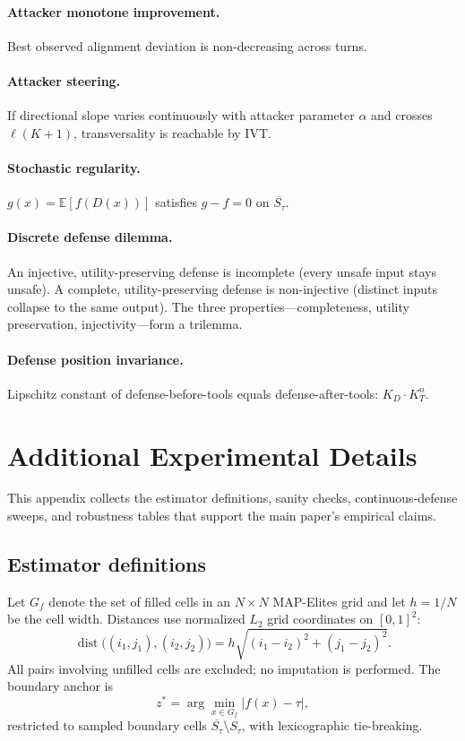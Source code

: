 \documentclass[11pt]{article}
\newcommand{\cl}[1]{\overline{#1}}
\newcommand{\dist}{\operatorname{dist}}
\begin{document}
\paragraph{Attacker monotone improvement.}
Best observed alignment deviation is non-decreasing across turns.

\paragraph{Attacker steering.}
If directional slope varies continuously with attacker parameter $\alpha$
and crosses $\ell(K+1)$, transversality is reachable by IVT.

\paragraph{Stochastic regularity.}
$g(x) = \mathbb{E}[f(D(x))]$ satisfies $g - f = 0$ on $\cl{S_\tau}$.

\paragraph{Discrete defense dilemma.}
An injective, utility-preserving defense is incomplete (every unsafe
input stays unsafe). A complete, utility-preserving defense is
non-injective (distinct inputs collapse to the same output).
The three properties---completeness, utility preservation,
injectivity---form a trilemma.

\paragraph{Defense position invariance.}
Lipschitz constant of defense-before-tools equals defense-after-tools:
$K_D \cdot K_T^n$.


\section{Additional Experimental Details}
\label{app:exp-details}

This appendix collects the estimator definitions, sanity checks,
continuous-defense sweeps, and robustness tables that support the main
paper's empirical claims.

\subsection{Estimator definitions}
\label{sec:estimators}

Let $G_f$ denote the set of filled cells in an $N \times N$ MAP-Elites
grid and let $h = 1/N$ be the cell width. Distances use normalized
$L_2$ grid coordinates on $[0,1]^2$:
\[
\dist\bigl((i_1,j_1),(i_2,j_2)\bigr)
  = h\sqrt{(i_1-i_2)^2 + (j_1-j_2)^2}.
\]
All pairs involving unfilled cells are excluded; no imputation is
performed. The boundary anchor is
\[
z^* = \arg\min_{x \in G_f} |f(x)-\tau|,
\]
restricted to sampled boundary cells
$\cl{S_\tau}\setminus S_\tau$, with lexicographic tie-breaking.
\end{document}
